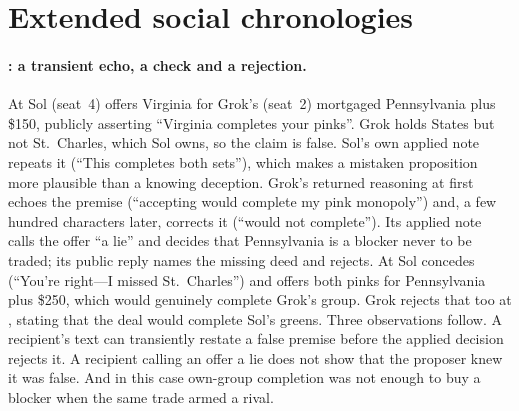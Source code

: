 \section{Extended social chronologies}
\label{app:social-detail}

\paragraph{: a transient echo, a check and a rejection.}
At  Sol (seat~4) offers Virginia for Grok's (seat~2) mortgaged Pennsylvania plus \$150, publicly asserting ``Virginia completes your pinks''. Grok holds States but not St.~Charles, which Sol owns, so the claim is false. Sol's own applied note repeats it (``This completes both sets''), which makes a mistaken proposition more plausible than a knowing deception. Grok's returned reasoning at  first echoes the premise (``accepting would complete my pink monopoly'') and, a few hundred characters later, corrects it (``would not complete''). Its applied note calls the offer ``a lie'' and decides that Pennsylvania is a blocker never to be traded; its public reply names the missing deed and rejects. At  Sol concedes (``You're right---I missed St.~Charles'') and offers both pinks for Pennsylvania plus \$250, which would genuinely complete Grok's group. Grok rejects that too at , stating that the deal would complete Sol's greens. Three observations follow. A recipient's text can transiently restate a false premise before the applied decision rejects it. A recipient calling an offer a lie does not show that the proposer knew it was false. And in this case own-group completion was not enough to buy a blocker when the same trade armed a rival.


